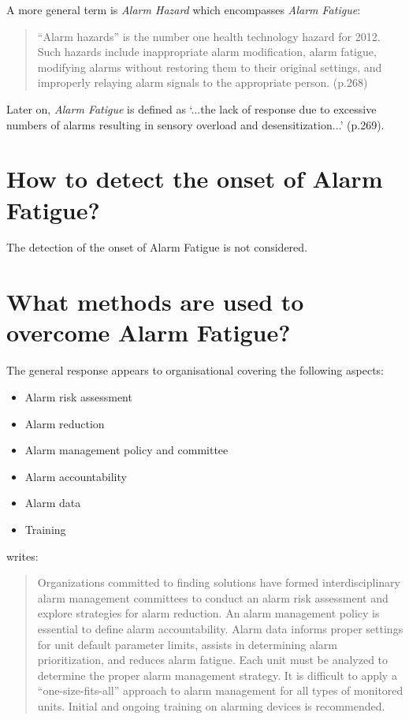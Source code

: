 A more general term is \textit{Alarm Hazard} which encompasses \textit{Alarm Fatigue}: \\

\begin{quote}
	“Alarm hazards” is the number one health technology hazard for 2012. Such hazards include inappropriate alarm modification, alarm fatigue, modifying alarms without restoring them to their original settings, and improperly relaying alarm signals to the appropriate person. (p.268)
\end{quote}

Later on, \textit{Alarm Fatigue} is defined as `...the lack of response due to excessive numbers of alarms resulting in sensory overload and desensitization...' (p.269).

\section{How to detect the onset of Alarm Fatigue?}

The detection of the onset of Alarm Fatigue is not considered.

\section{What methods are used to overcome Alarm Fatigue?}

The general response appears to organisational covering the following aspects: \\

\begin{itemize}
	\item Alarm risk assessment
	\item Alarm reduction
	\item Alarm management policy and committee
	\item Alarm accountability
	\item Alarm data
	\item Training
\end{itemize}

\citet[p.273]{cvach2012monitor} writes: \\

\begin{quotation}
	Organizations committed to finding solutions have formed interdisciplinary alarm management committees to conduct an alarm risk assessment and explore strategies for alarm reduction. An alarm management policy is essential to define alarm accountability. Alarm data informs proper settings for unit default parameter limits, assists in determining alarm prioritization, and reduces alarm fatigue. Each unit must be analyzed to determine the proper alarm management strategy. It is difficult to apply a “one-size-fits-all” approach to alarm management for all types of monitored units. Initial and ongoing training on alarming devices is recommended.
\end{quotation}

